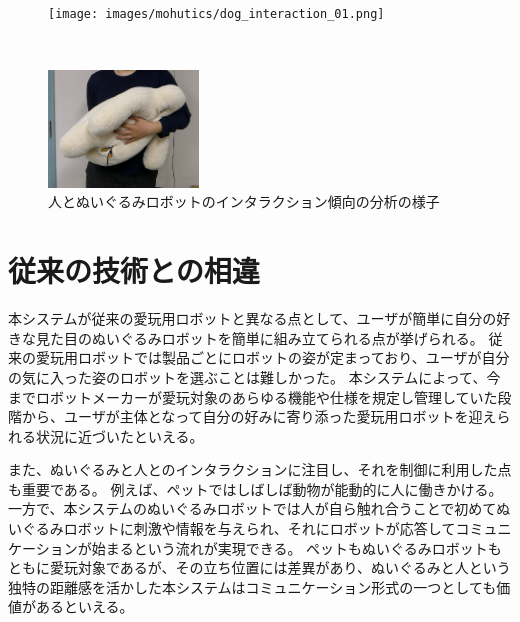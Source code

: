 \documentclass[uplatex,a4paper,12pt]{jsarticle}
\begin{document}

\begin{figure}[htbp]
  \centering
  \begin{minipage}[c]{0.96\linewidth}
    \centering
    \texttt{[image: images/mohutics/dog\_interaction\_01.png]}
  \end{minipage} \\
  \begin{minipage}[c]{0.96\linewidth}
    \centering
    \includegraphics[keepaspectratio,width=4cm,clip]{images/mohutics/funio_interaction_01.png}
  \end{minipage}
  \caption{人とぬいぐるみロボットのインタラクション傾向の分析の様子}
  \label{fig:mohutics:interaction}
\end{figure}


\section{従来の技術との相違}
本システムが従来の愛玩用ロボットと異なる点として、ユーザが簡単に自分の好きな見た目のぬいぐるみロボットを簡単に組み立てられる点が挙げられる。
従来の愛玩用ロボットでは製品ごとにロボットの姿が定まっており、ユーザが自分の気に入った姿のロボットを選ぶことは難しかった。
本システムによって、今までロボットメーカーが愛玩対象のあらゆる機能や仕様を規定し管理していた段階から、ユーザが主体となって自分の好みに寄り添った愛玩用ロボットを迎えられる状況に近づいたといえる。

また、ぬいぐるみと人とのインタラクションに注目し、それを制御に利用した点も重要である。
例えば、ペットではしばしば動物が能動的に人に働きかける。
一方で、本システムのぬいぐるみロボットでは人が自ら触れ合うことで初めてぬいぐるみロボットに刺激や情報を与えられ、それにロボットが応答してコミュニケーションが始まるという流れが実現できる。
ペットもぬいぐるみロボットもともに愛玩対象であるが、その立ち位置には差異があり、ぬいぐるみと人という独特の距離感を活かした本システムはコミュニケーション形式の一つとしても価値があるといえる。
\end{document}
